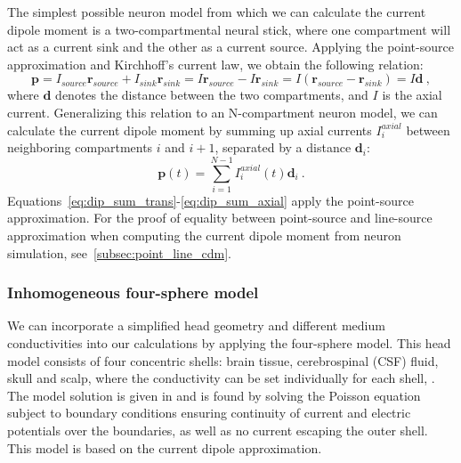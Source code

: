 \documentclass[preprint,10pt,authoryear]{elsarticle}
\begin{document}
The simplest possible neuron model from which we can calculate the current dipole moment is a  two-compartmental neural stick, where one compartment will act as a current sink and the other as a current source. Applying the point-source approximation and Kirchhoff's current law, we obtain the following relation:
\begin{equation}\label{eq:dip_trans_to_axial}
\mathbf{p} = I_{source} \mathbf{r}_{source} + I_{sink} \mathbf{r}_{sink}
= I \mathbf{r}_{source} - I \mathbf{r}_{sink}
= I (\mathbf{r}_{source} - \mathbf{r}_{sink}) = I \mathbf{d}~,
\end{equation}
where $\mathbf{d}$ denotes the distance between the two compartments, and $I$ is the axial current. Generalizing this relation to an N-compartment neuron model, we can calculate the current dipole moment by summing up axial currents $I_i^{axial}$ between neighboring compartments $i$ and $i+1$, separated by a distance $\mathbf{d}_i$:
\begin{equation}\label{eq:dip_sum_axial}
\mathbf{p}(t) = \sum_{i=1}^{N-1} I_i^{axial}(t) \mathbf{d}_i~.
\end{equation}
Equations~\eqref{eq:dip_sum_trans}-\eqref{eq:dip_sum_axial} apply the point-source approximation. For the proof of equality between point-source and line-source approximation when computing the current dipole moment from neuron simulation, see~\ref{subsec:point_line_cdm}.

\subsubsection{Inhomogeneous four-sphere model}
We can incorporate a simplified head geometry and different medium conductivities into our calculations by applying the four-sphere model. This head model consists of four concentric shells: brain tissue, cerebrospinal (CSF) fluid, skull and scalp, where the conductivity can be set individually for each shell, \citep{SRINIVASAN1998,NUNEZ2006}. The model solution is given in \citep{NAESS2017} and is found by solving the Poisson equation subject to boundary conditions ensuring continuity of current and electric potentials over the boundaries, as well as no current escaping the outer shell. This model is based on the current dipole approximation.
\end{document}
